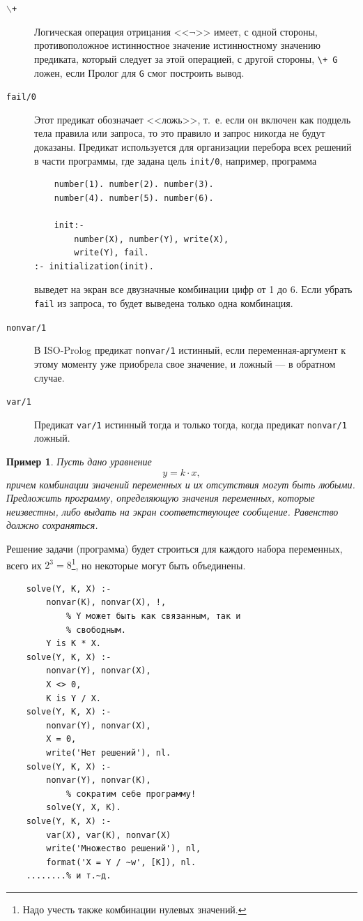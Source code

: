 \documentclass[12pt, openany, twoside]{book} %
\newtheorem{example}{Пример}[chapter]
\begin{document}
\begin{description}
\item[{\tt $\backslash$+}] Логическая операция отрицания <<$\neg$>> имеет, с одной стороны, противоположное истинностное значение истинностному значению пре\-ди\-ка\-та, который следует за этой операцией, с другой стороны, {\tt \verb|\+| G} ложен, если Пролог для  {\tt G} смог построить вывод.
\item[\tt fail/0] Этот предикат обозначает <<ложь>>, т.~е. если он включен как подцель тела правила или запроса, то это правило и запрос никогда не будут доказаны. Предикат используется для организации перебора всех решений в части программы, где задана цель \texttt{init/0}, например, программа
{\tt \begin{verbatim}
    number(1). number(2). number(3).
    number(4). number(5). number(6).

    init:-
        number(X), number(Y), write(X),
        write(Y), fail.
:- initialization(init).
\end{verbatim}}
выведет на экран все двузначные комбинации цифр от 1 до 6. Если убрать {\tt fail} из запроса, то будет выведена только одна комбинация.
\item[\tt nonvar/1] В ISO-Prolog предикат {\tt nonvar/1} истинный, если пе\-ре\-мен\-ная-аргумент к этому моменту уже приобрела свое значение, и ложный --- в обратном случае.
\item[\tt var/1] Предикат {\tt var/1} истинный тогда и только тогда, когда предикат {\tt nonvar/1} ложный.
\end{description}

\begin{example}  Пусть дано уравнение
$$
    y=k\cdot x,
$$
причем комбинации значений переменных и их отсутствия могут быть любыми. Предложить программу, определяющую значения переменных, которые неизвестны,  либо выдать на экран соответствующее сообщение. Равенство должно сохраняться.
\end{example}

Решение задачи (программа) будет строиться для каждого набора переменных, всего их $2^3=8$\footnote{Надо учесть также комбинации нулевых значений.}, но некоторые могут быть объединены.

{\tt \begin{verbatim}
    solve(Y, K, X) :-
        nonvar(K), nonvar(X), !,
            % Y может быть как связанным, так и
            % свободным.
        Y is K * X.
    solve(Y, K, X) :-
        nonvar(Y), nonvar(X),
        X <> 0,
        K is Y / X.
    solve(Y, K, X) :-
        nonvar(Y), nonvar(X),
        X = 0,
        write('Нет решений'), nl.
    solve(Y, K, X) :-
        nonvar(Y), nonvar(K),
            % сократим себе программу!
        solve(Y, X, K).
    solve(Y, K, X) :-
        var(X), var(K), nonvar(X)
        write('Множество решений'), nl,
        format('X = Y / ~w', [K]), nl.
    ........% и т.~д.
\end{verbatim}}
\end{document}
